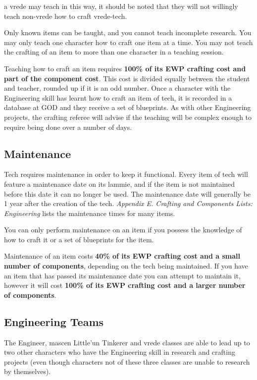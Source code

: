 \documentclass{scrbook}
\begin{document}
a vrede may teach in this way, it should be noted that they will not willingly teach non-vrede how to craft vrede-tech.

Only known items can be taught, and you cannot teach incomplete research. You may only teach one character how to craft one item at a time. You may not teach the crafting of an item to more than one character in a teaching session.

Teaching how to craft an item requires \textbf{100\% of its EWP crafting cost and part of the component cost}. This cost is divided equally between the student and teacher, rounded up if it is an odd number. Once a character with the Engineering skill has learnt how to craft an item of tech, it is recorded in a database at GOD and they receive a set of blueprints. As with other Engineering projects, the crafting referee will advise if the teaching will be complex enough to require being done over a number of days.

    \subsection{Maintenance}

Tech requires maintenance in order to keep it functional. Every item of tech will feature a maintenance date on its lammie, and if the item is not maintained before this date it can no longer be used. The maintenance date will generally be 1 year after the creation of the tech. \textit{Appendix E. Crafting and Components Lists:} \textit{Engineering} lists the maintenance times for many items.

You can only perform maintenance on an item if you possess the knowledge of how to craft it or a set of blueprints for the item.

Maintenance of an item costs \textbf{40\% of its EWP crafting cost and a small number of components}, depending on the tech being maintained. If you have an item that has passed its maintenance date you can attempt to maintain it, however it will cost \textbf{100\% of its EWP crafting cost and a larger number of components}.

    \subsection{Engineering Teams}

The Engineer, mascen Little'un Tinkerer and vrede classes are able to lead up to two other characters who have the Engineering skill in research and crafting projects (even though characters not of these three classes are unable to research by themselves).
\end{document}
